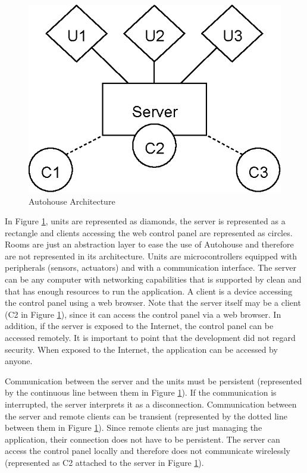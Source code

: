 \begin{figure}[H]
\begin{center}
\includegraphics[scale=1.0]{thesis/img/autohouse_arch.eps}
\end{center}
\caption{Autohouse Architecture}
\label{fig:autohouse_arch}
\end{figure}

In Figure \ref{fig:autohouse_arch}, units are represented as diamonds, the server is represented as a rectangle and clients accessing the web control panel are represented as circles. Rooms are just an abstraction layer to ease the use of Autohouse and therefore are not represented in its architecture. Units are microcontrollers equipped with peripherals (sensors, actuators) and with a communication interface. The server can be any computer with networking capabilities that is supported by \gls{clean} and that has enough resources to run the application. A client is a device accessing the control panel using a web browser. Note that the server itself may be a client (C2 in Figure \ref{fig:autohouse_arch}), since it can access the control panel via a web browser. In addition, if the server is exposed to the Internet, the control panel can be accessed remotely. It is important to point that the development did not regard security. When exposed to the Internet, the application can be accessed by anyone.

Communication between the server and the units must be persistent (represented by the continuous line between them in Figure \ref{fig:autohouse_arch}). If the communication is interrupted, the server interprets it as a disconnection. Communication between the server and remote clients can be transient (represented by the dotted line between them in Figure \ref{fig:autohouse_arch}). Since remote clients are just managing the application, their connection does not have to be persistent. The server can access the control panel locally and therefore does not communicate wirelessly (represented as C2 attached to the server in Figure \ref{fig:autohouse_arch}).

